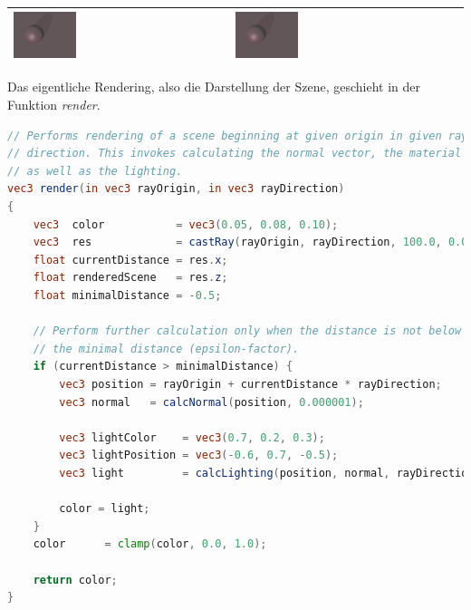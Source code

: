 \begin{table}[H]
\begin{tabular}{p{}p{}p{}}
            \includegraphics[width=0.3\textwidth]{img/sphere_tracing_shadows_128.pdf} \newline &
            \includegraphics[width=0.3\textwidth]{img/sphere_tracing_shadows_256.pdf} \newline \\
        \bottomrule
    \end{tabular}
\end{table}

Das eigentliche Rendering, also die Darstellung der Szene, geschieht in
der Funktion \textit{render}.

\begin{lstlisting}[language=GLSL,caption={Funktion zur Darstellung der
        Szene in
        GLSL. Die Szene bzw.\ der Farbwert wird nur dann zurückgegeben
        bzw.\ berechnet, wenn eine minimale Distanz nicht unterschritten
        wird.},label={alg:glsl_render},captionpos=b,emph={render}]
// Performs rendering of a scene beginning at given origin in given ray
// direction. This invokes calculating the normal vector, the material
// as well as the lighting.
vec3 render(in vec3 rayOrigin, in vec3 rayDirection)
{
    vec3  color           = vec3(0.05, 0.08, 0.10);
    vec3  res             = castRay(rayOrigin, rayDirection, 100.0, 0.00001, 100);
    float currentDistance = res.x;
    float renderedScene   = res.z;
    float minimalDistance = -0.5;

    // Perform further calculation only when the distance is not below
    // the minimal distance (epsilon-factor).
    if (currentDistance > minimalDistance) {
        vec3 position = rayOrigin + currentDistance * rayDirection;
        vec3 normal   = calcNormal(position, 0.000001);

        vec3 lightColor    = vec3(0.7, 0.2, 0.3);
        vec3 lightPosition = vec3(-0.6, 0.7, -0.5);
        vec3 light         = calcLighting(position, normal, rayDirection, material, lightPosition, lightColor);

        color = light;
    }
    color      = clamp(color, 0.0, 1.0);

    return color;
}
\end{lstlisting}

